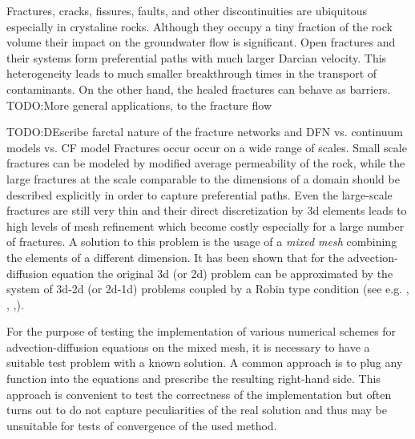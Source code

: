 \documentclass{elsarticle}
\def\todo#1{{TODO:\color{red}#1}}
\begin{document}
Fractures, cracks, fissures, faults, and other discontinuities are ubiquitous  especially in crystaline rocks.  Although they occupy a tiny fraction of the rock volume their impact
on the groundwater flow is significant. Open fractures and their systems form preferential paths with much larger Darcian velocity. This heterogeneity leads to much smaller breakthrough times in the transport of contaminants. On the other hand, the healed fractures can behave as barriers.
\todo{More general applications, to the fracture flow}


\todo{DEscribe farctal nature of the fracture networks and DFN vs. continuum models vs. CF model}
Fractures occur occur on a wide range of scales. Small scale fractures can be modeled by modified average permeability of the rock, while the large fractures at the scale comparable to the dimensions of a domain should be described explicitly in order to capture preferential paths. Even the large-scale fractures are still very thin and their direct discretization by 3d elements leads to high levels of mesh refinement which become 
costly especially for a large number of fractures. A solution to this problem is the usage of a {\it mixed mesh} combining the elements of a different dimension. It has been shown that for the advection-diffusion equation the original 3d (or 2d) problem can be approximated by the system of 3d-2d (or 2d-1d) problems coupled by a Robin type condition (see e.g. \cite{Martin2005}, \cite{fumagalli_numerical_2011}, \cite{Angot},\cite{brezina_analysis_2015}). 

For the purpose of testing the implementation of various numerical schemes for advection-diffusion equations on the mixed mesh, it is necessary to have a suitable test problem with a known solution. A common approach is to plug any function into the equations and prescribe the resulting right-hand side. This approach is convenient to test the correctness of the implementation but often turns out to
do not capture peculiarities of the real solution and thus may be unsuitable for tests of convergence of the used method. 
\end{document}
